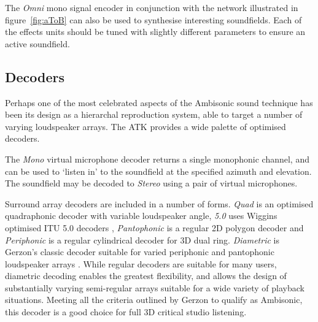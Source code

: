 \documentclass{article}
\begin{document}
The \emph{Omni} mono signal encoder in conjunction with the network illustrated in figure~\ref{fig:aToB} can also be used to synth\-esise interesting soundfields.
Each of the effects units \linebreak should be tuned with slightly different parameters to ensure an active soundfield.





\subsection{Decoders}\label{sec:decoders}

Perhaps one of the most celebrated aspects of the Ambisonic sound technique has been its design as a hierarchal reproduction system, able to target a number of varying loudspeaker arrays.
The ATK provides a wide palette of optimised decoders.

The \emph{Mono} virtual microphone decoder returns a single monophonic channel, and can be used to `listen in' to the soundfield at the specified azimuth and elevation.
The soundfield may be decoded to \emph{Stereo} using a pair of virtual microphones.

Surround array decoders are included in a number of forms. \emph{Quad} is an optimised quadraphonic decoder with variable loudspeaker angle, \emph{5.0} uses Wiggins optimised ITU 5.0 decoders \cite{wiggins:2003optimised}, \emph{Pantophonic} is a regular 2D polygon decoder and \emph{Periphonic} is a regular cylindrical decoder for 3D dual ring.
\emph{Diametric} is Gerzon's classic decoder suitable for varied periphonic and pantophonic loudspeaker arrays \cite{gerzon:1980sphere}.
While regular decoders are suitable for many users, diametric decoding enables the greatest flexibility, and allows the design of substantially varying semi-regular arrays suitable for a wide variety of playback situations.
Meeting all the criteria outlined by Gerzon to qualify as Ambisonic, this decoder is a good choice for full 3D critical studio listening.
\end{document}
